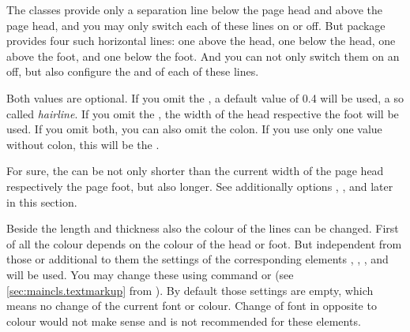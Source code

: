 \begin{Declaration}
\end{Declaration}
The \KOMAScript{} classes provide only a separation line below the page head
and above the page head, and you may only switch each of these lines on or
off. But package  provides four such horizontal
lines: one above the head, one below the head, one above the foot, and one
below the foot. And you can not only switch them on an off, but also configure
the  and  of each of these lines.

Both values are optional. If you omit the , a default value
of 0.4 will be used, a so called \emph{hairline}. If you omit the
, the width of the head respective the foot will be used. If you
omit both, you can also omit the colon. If you use only one value without
colon, this will be the .

For sure, the  can be not only shorter than the current width of
the page head respectively the page foot, but also longer. See additionally
options ,
, and 
later in this section.

%
%
%
%
Beside the length and thickness also the colour of the lines can be
changed. First of all the colour depends on the colour of the head or
foot. But independent from those or additional to them the settings of the
corresponding elements , ,
, and  will be used. You may
change these using command  or  (see
\autoref{sec:maincls.textmarkup} from
). By default those settings are
empty, which means no change of the current font or colour. Change of font in
opposite to colour would not make sense and is not recommended for these
elements.%
%
%
%
%

